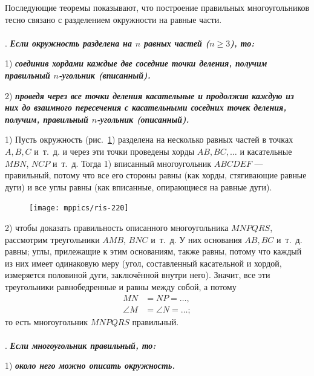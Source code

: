 \documentclass[twoside]{book}
\begin{document}
Последующие теоремы показывают, что построение правильных многоугольников тесно связано с разделением окружности на равные части.

\paragraph{}\label{1938/213}
.
\textbf{\emph{Если окружность разделена на $n$ равных частей ($n\ge 3$), то:}}

1) \textbf{\emph{соединив хордами каждые две соседние точки деления, получим правильный $n$-угольник (вписанный).}}

2) \textbf{\emph{проведя через все точки деления касательные и продолжив каждую из них до взаимного пересечения с касательными соседних точек деления, получим, правильный $n$-угольник (описанный).}}


1) Пусть окружность (рис.~\ref{1938/ris-220}) разделена на несколько равных частей в точках $A, B, C$ и~т.~д.
и через эти точки проведены хорды $AB, BC,\dots$
и касательные $MBN$, $NCP$ и~т.~д.
Тогда 1) вписанный многоугольник $ABCDEF$ — правильный, потому что все его стороны равны (как хорды, стягивающие равные дуги) и все углы равны (как вписанные, опирающиеся на равные дуги).

\begin{figure}
\centering
\texttt{[image: mppics/ris-220]}
\caption{}\label{1938/ris-220}
\end{figure}

2) чтобы доказать правильность описанного многоугольника $MNPQRS$, рассмотрим треугольники $AMB$, $BNC$ и~т.~д.
У них основания $AB, BC$ и~т.~д.
равны;
углы, прилежащие к этим основаниям, также равны, потому что каждый из них имеет одинаковую меру (угол, составленный касательной и хордой, измеряется половиной дуги, заключённой внутри него).
Значит, все эти треугольники равнобедренные и равны между собой, а потому 
\begin{align*}
MN&=NP=\dots,
\\
\angle M&=\angle N=\dots;
\end{align*}
то есть многоугольник $MNPQRS$ правильный.

\paragraph{}\label{1938/215}
.
\textbf{\emph{Если многоугольник правильный, то:}}

1) \textbf{\emph{около него можно описать окружность.}}
\end{document}
